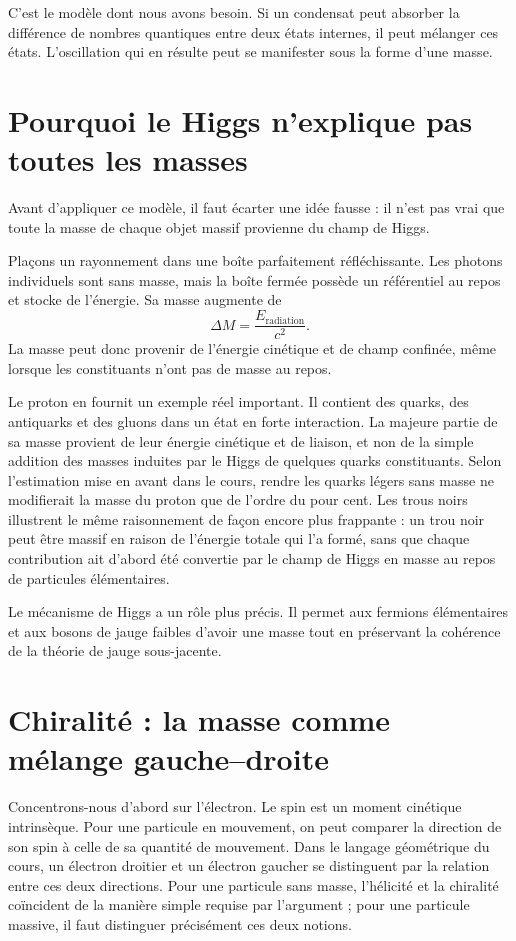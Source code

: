 C’est le modèle dont nous avons besoin. Si un condensat peut absorber la différence de nombres quantiques entre deux états internes, il peut mélanger ces états. L’oscillation qui en résulte peut se manifester sous la forme d’une masse.

\section{Pourquoi le Higgs n’explique pas toutes les masses}

Avant d’appliquer ce modèle, il faut écarter une idée fausse : il n’est pas vrai que toute la masse de chaque objet massif provienne du champ de Higgs.

Plaçons un rayonnement dans une boîte parfaitement réfléchissante. Les photons individuels sont sans masse, mais la boîte fermée possède un référentiel au repos et stocke de l’énergie. Sa masse augmente de
\begin{equation}
\Delta M=\frac{E_{\mathrm{radiation}}}{c^{2}}.
\end{equation}
La masse peut donc provenir de l’énergie cinétique et de champ confinée, même lorsque les constituants n’ont pas de masse au repos.

Le proton en fournit un exemple réel important. Il contient des quarks, des antiquarks et des gluons dans un état en forte interaction. La majeure partie de sa masse provient de leur énergie cinétique et de liaison, et non de la simple addition des masses induites par le Higgs de quelques quarks constituants. Selon l’estimation mise en avant dans le cours, rendre les quarks légers sans masse ne modifierait la masse du proton que de l’ordre du pour cent. Les trous noirs illustrent le même raisonnement de façon encore plus frappante : un trou noir peut être massif en raison de l’énergie totale qui l’a formé, sans que chaque contribution ait d’abord été convertie par le champ de Higgs en masse au repos de particules élémentaires.

Le mécanisme de Higgs a un rôle plus précis. Il permet aux fermions élémentaires et aux bosons de jauge faibles d’avoir une masse tout en préservant la cohérence de la théorie de jauge sous-jacente.

\section{Chiralité : la masse comme mélange gauche--droite}

Concentrons-nous d’abord sur l’électron. Le spin est un moment cinétique intrinsèque. Pour une particule en mouvement, on peut comparer la direction de son spin à celle de sa quantité de mouvement. Dans le langage géométrique du cours, un électron droitier et un électron gaucher se distinguent par la relation entre ces deux directions. Pour une particule sans masse, l’hélicité et la chiralité coïncident de la manière simple requise par l’argument ; pour une particule massive, il faut distinguer précisément ces deux notions.

